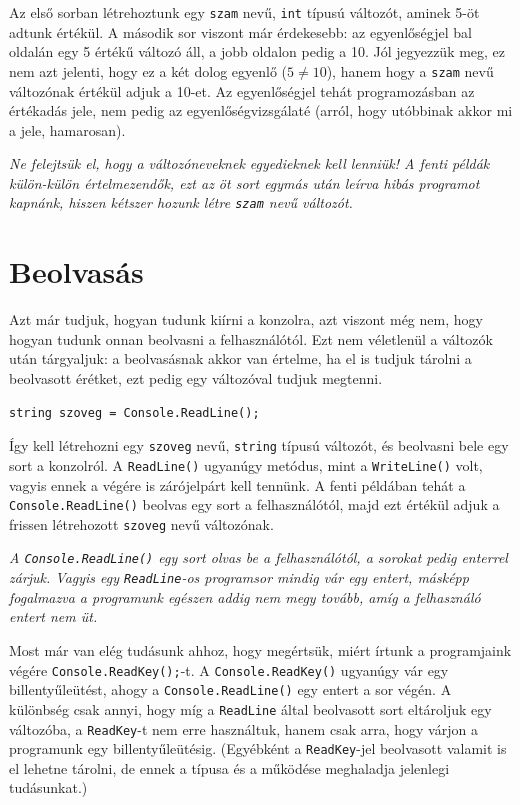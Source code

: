 \documentclass[a4paper]{article}
\begin{document}
Az első sorban létrehoztunk egy \lstinline{szam} nevű, \lstinline{int} típusú változót, aminek 5-öt adtunk értékül. A második sor viszont már érdekesebb: az egyenlőségjel bal oldalán egy 5 értékű változó áll, a jobb oldalon pedig a 10. Jól jegyezzük meg, ez nem azt jelenti, hogy ez a két dolog egyenlő ($5 \neq 10$), hanem hogy a \lstinline{szam} nevű változónak értékül adjuk a 10-et. Az egyenlőségjel tehát programozásban az értékadás jele, nem pedig az egyenlőségvizsgálaté (arról, hogy utóbbinak akkor mi a jele, hamarosan).

\emph{Ne felejtsük el, hogy a változóneveknek egyedieknek kell lenniük! A fenti példák külön-külön értelmezendők, ezt az öt sort egymás után leírva hibás programot kapnánk, hiszen kétszer hozunk létre \lstinline{szam} nevű változót.}

\section{Beolvasás}
Azt már tudjuk, hogyan tudunk kiírni a konzolra, azt viszont még nem, hogy hogyan tudunk onnan beolvasni a felhasználótól. Ezt nem véletlenül a változók után tárgyaljuk: a beolvasásnak akkor van értelme, ha el is tudjuk tárolni a beolvasott érétket, ezt pedig egy változóval tudjuk megtenni.

\begin{lstlisting}[caption=Beolvasás, label=lst:read]
string szoveg = Console.ReadLine();
\end{lstlisting}

Így kell létrehozni egy \lstinline{szoveg} nevű, \lstinline{string} típusú változót, és beolvasni bele egy sort a konzolról. A \lstinline{ReadLine()} ugyanúgy metódus, mint a \lstinline{WriteLine()} volt, vagyis ennek a végére is zárójelpárt kell tennünk. A fenti példában tehát a \lstinline{Console.ReadLine()} beolvas egy sort a felhasználótól, majd ezt értékül adjuk a frissen létrehozott \lstinline{szoveg} nevű változónak.

\emph{A \lstinline{Console.ReadLine()} egy sort olvas be a felhasználótól, a sorokat pedig enterrel zárjuk. Vagyis egy \lstinline{ReadLine}-os programsor mindig vár egy entert, másképp fogalmazva a programunk egészen addig nem megy tovább, amíg a felhasználó entert nem üt.}

Most már van elég tudásunk ahhoz, hogy megértsük, miért írtunk a programjaink végére \lstinline{Console.ReadKey();}-t. A \lstinline{Console.ReadKey()} ugyanúgy vár egy billentyűleütést, ahogy a \lstinline{Console.ReadLine()} egy entert a sor végén. A különbség csak annyi, hogy míg a \lstinline{ReadLine} által beolvasott sort eltároljuk egy változóba, a \lstinline{ReadKey}-t nem erre használtuk, hanem csak arra, hogy várjon a programunk egy billentyűleütésig. (Egyébként a \lstinline{ReadKey}-jel beolvasott valamit is el lehetne tárolni, de ennek a típusa és a működése meghaladja jelenlegi tudásunkat.)
\end{document}
